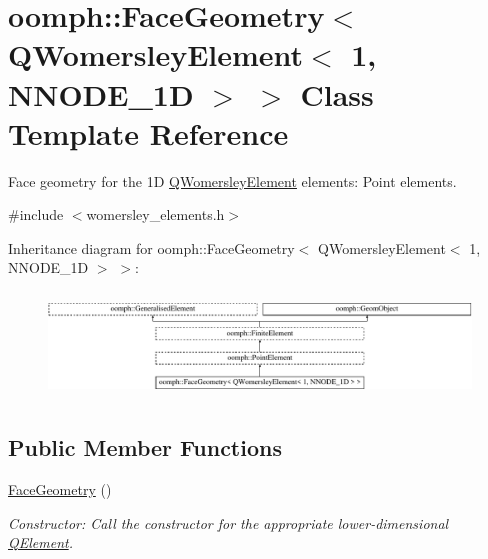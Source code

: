 \hypertarget{classoomph_1_1FaceGeometry_3_01QWomersleyElement_3_011_00_01NNODE__1D_01_4_01_4}{}\section{oomph\+:\+:Face\+Geometry$<$ Q\+Womersley\+Element$<$ 1, N\+N\+O\+D\+E\+\_\+1D $>$ $>$ Class Template Reference}
\label{classoomph_1_1FaceGeometry_3_01QWomersleyElement_3_011_00_01NNODE__1D_01_4_01_4}


Face geometry for the 1D \hyperlink{classoomph_1_1QWomersleyElement}{Q\+Womersley\+Element} elements\+: Point elements.  




{\ttfamily \#include $<$womersley\+\_\+elements.\+h$>$}

Inheritance diagram for oomph\+:\+:Face\+Geometry$<$ Q\+Womersley\+Element$<$ 1, N\+N\+O\+D\+E\+\_\+1D $>$ $>$\+:\begin{figure}[H]
\begin{center}
\leavevmode
\includegraphics[height=2.842639cm]{classoomph_1_1FaceGeometry_3_01QWomersleyElement_3_011_00_01NNODE__1D_01_4_01_4}
\end{center}
\end{figure}
\subsection*{Public Member Functions}
\begin{DoxyCompactItemize}
\item 
\hyperlink{classoomph_1_1FaceGeometry_3_01QWomersleyElement_3_011_00_01NNODE__1D_01_4_01_4_a565684012c2ea2a9abfc9364d2905448}{Face\+Geometry} ()
\begin{DoxyCompactList}\small\item\em Constructor\+: Call the constructor for the appropriate lower-\/dimensional \hyperlink{classoomph_1_1QElement}{Q\+Element}. \end{DoxyCompactList}\end{DoxyCompactItemize}
